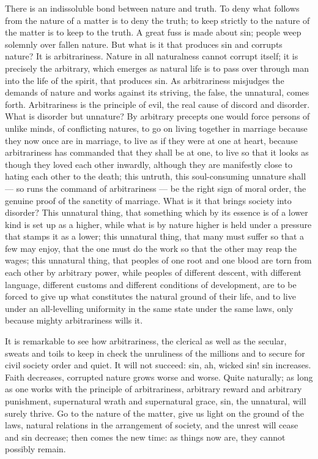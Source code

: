 \documentclass[12pt,a4paper,openany]{book}
\newcommand{\opage}[1]{\marginnote{\footnotesize\textit{[#1]}}}
\begin{document}
There is an indissoluble bond between nature and
truth. To deny what follows from the
\setcounter{footnote}{0}%
\opage{5}nature of a matter is to deny the truth; to keep strictly
to the nature of the matter is to keep to the truth. A great
fuss is made about sin; people weep solemnly over
fallen nature. But what is it that produces
sin and corrupts nature? It is arbitrariness.
Nature in all naturalness cannot corrupt itself;
it is precisely the arbitrary, which emerges as natural life
is to pass over through man into the life of the spirit,
that produces sin. As arbitrariness misjudges
the demands of nature and works against its striving,
the false, the unnatural, comes forth. Arbitrariness
is the principle of evil, the real cause of
discord and disorder. What is disorder but
unnature? By arbitrary precepts one would force
persons of unlike minds, of conflicting natures, to go on
living together in marriage because they now once
are in marriage, to live as if they were at one at heart,
because arbitrariness has commanded that they shall be
at one, to live so that it looks as though they loved
each other inwardly, although they are manifestly close to hating
each other to the death; this untruth, this soul-consuming
unnature shall --- so runs the command of arbitrariness --- be
the right sign of moral order, the genuine proof of
the sanctity of marriage. What is it that brings
society into disorder? This unnatural thing, that something which
by its essence is of a lower kind is set up as a
higher, while what is by nature higher is held under a
pressure that stamps it as a lower; this unnatural thing,
that many must suffer so that a few may enjoy,
that the one must do the work so that the other may
reap the wages; this unnatural thing, that peoples of one
root and one blood are torn from each other by arbitrary
\setcounter{footnote}{0}%
\opage{6}power, while peoples of different descent, with different
language, different customs and different conditions of development,
are to be forced to give up what
constitutes the natural ground of their life, and to live under an
all-levelling uniformity in the same state under
the same laws, only because mighty arbitrariness
wills it.

It is remarkable to see how arbitrariness,
the clerical as well as the secular, sweats and toils
to keep in check the unruliness of the millions and
to secure for civil society order and quiet. It will
not succeed: sin, ah, wicked sin! sin
increases. Faith decreases, corrupted nature grows
worse and worse. Quite naturally; as long as one works
with the principle of arbitrariness, arbitrary reward and
arbitrary punishment, supernatural wrath and supernatural
grace, sin, the unnatural, will surely thrive. Go
to the nature of the matter, give us light on the ground of the laws,
natural relations in the arrangement of society, and the unrest
will cease and sin decrease; then comes the new
time: as things now are, they cannot possibly remain.
\end{document}
